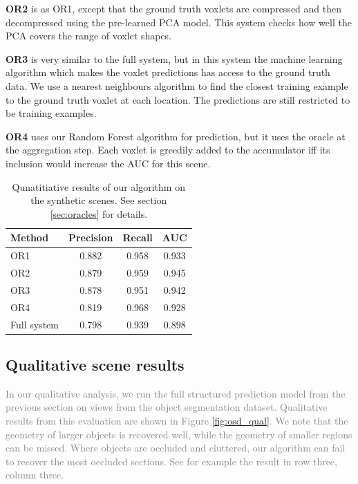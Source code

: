 \documentclass[10pt,twocolumn,letterpaper]{article}
\newcommand{\remove}[1]{\textcolor{grey}{#1}}
\begin{document}
\textbf{OR2} is as OR1, except that the ground truth voxlets are compressed and then decompressed using the pre-learned PCA model. This system checks how well the PCA covers the range of voxlet shapes.

\textbf{OR3} is very similar to the full system, but in this system the machine learning algorithm which makes the voxlet predictions has access to the ground truth data. We use a nearest neighbours algorithm to find the closest training example to the ground truth voxlet at each location. The predictions are still restricted to be training examples.

\textbf{OR4} uses our Random Forest algorithm for prediction, but it uses the oracle at the aggregation step. Each voxlet is greedily added to the accumulator iff its inclusion would increase the AUC for this scene.


\begin{table}
  \centering
  \begin{tabular}{|p{2.2cm}|c|c|c|}
  \hline
  \textbf{Method}  &   \textbf{Precision} & \textbf{Recall} & \textbf{AUC} \\
  \hline
  OR1 & 0.882 & 0.958   & 0.933 \\
  OR2 & 0.879 & 0.959 & 0.945 \\
  OR3 & 0.878 & 0.951 & 0.942 \\
  OR4 & 0.819 & 0.968 & 0.928 \\
  \hline
  Full system & 0.798 & 0.939 & 0.898 \\
  \hline
  \end{tabular}
  \vspace{5pt}
  \caption{Qunatitiative results of our algorithm on the synthetic scenes. See section \ref{sec:oracles} for details.}
    \label{tab:oracle_results}
\end{table}





\subsection{Qualitative scene results}
\label{sec:qualit}
\remove{In our qualitative analysis, we run the full structured prediction model from the previous section on views from the object segmentation dataset.
Qualitative results from this evaluation are shown in Figure \ref{fig:osd_qual}.
We note that the geometry of larger objects is recovered well, while the geometry of smaller regions can be missed.
Where objects are occluded and cluttered, our algorithm can fail to recover the most occluded sections.
See for example the result in row three, column three.}
\end{document}
